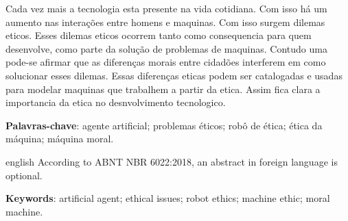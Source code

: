 \documentclass[
	article,			%
	11pt,				%
	oneside,			%
	a4paper,			%
	english,			%
	brazil,				%
	sumario=tradicional
	]{abntex2}
\begin{document}
\frenchspacing
%
\maketitle

\begin{resumoumacoluna}
   Cada vez mais a tecnologia esta presente na vida cotidiana. Com isso há um aumento nas interações entre homens e maquinas. Com isso surgem dilemas eticos. Esses dilemas eticos ocorrem tanto como consequencia para quem desenvolve, como parte da solução de problemas de maquinas. Contudo uma pode-se afirmar que as diferenças morais entre cidadões interferem em como solucionar esses dilemas. Essas diferenças eticas podem ser catalogadas e usadas para modelar maquinas que trabalhem a partir da etica. Assim fica clara a importancia da etica no desnvolvimento tecnologico.

   \vspace{\onelineskip}

   \noindent
   \textbf{Palavras-chave}: agente artificial; problemas éticos; robô de ética; ética da máquina; máquina moral.
\end{resumoumacoluna}

\renewcommand{\resumoname}{Abstract}
\begin{resumoumacoluna}
   \begin{otherlanguage*}{english}
      According to ABNT NBR 6022:2018, an abstract in foreign language is optional.

      \vspace{\onelineskip}

      \noindent
      \textbf{Keywords}: artificial agent; ethical issues; robot ethics; machine ethic; moral machine.
   \end{otherlanguage*}
\end{resumoumacoluna}
\end{document}
